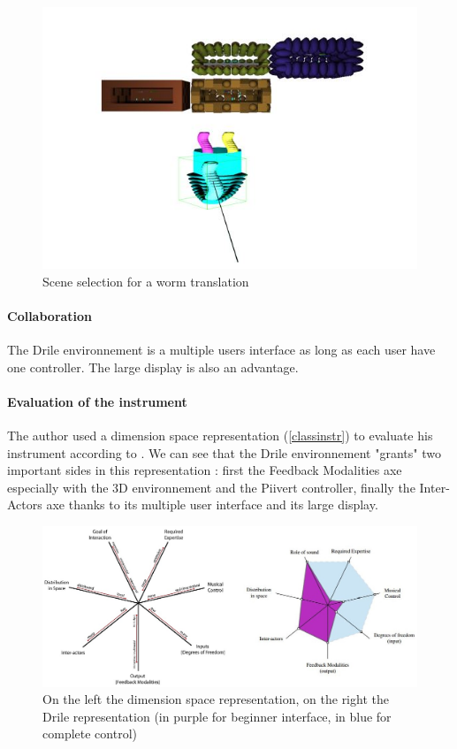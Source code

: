 \begin{figure}[h!]
\centering\includegraphics[scale=0.55]{image/scenes.JPG}
\caption{Scene selection for a worm translation}
\label{fig:scene}
\end{figure} 

\paragraph{Collaboration}

The Drile environnement is a multiple users interface as long as each user have one controller. The large display is also an advantage.

\paragraph{Evaluation of the instrument}

The author used a dimension space representation (\ref{classinstr}) to evaluate his instrument according to \cite{birnbaum2005towards}. We can see that the Drile environnement "grants" two important sides in this representation : first the Feedback Modalities axe especially with the 3D environnement and the Piivert controller, finally the Inter-Actors axe thanks to its multiple user interface and its large display.

\begin{figure}[h!]
\centering\includegraphics[scale=0.55]{image/classification_new_instr.jpg}
\caption{On the left the dimension space representation,
on the right the Drile representation (in purple for beginner interface, in blue for complete control)}
\label{fig:classinstr}
\end{figure} 


